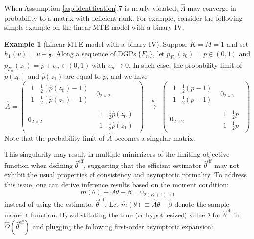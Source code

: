 \documentclass[11pt]{article}
\theoremstyle{definition}
\newtheorem{example}{Example}[section]
\newcommand{\0}{\ensuremath{\mathbf{0}}}
\begin{document}
\begin{bibunit}
When Assumption \ref{asp:identification}.7 is nearly violated, $\hat{A}$ may converge in probability to a matrix with deficient rank. For example, consider the following simple example on the linear MTE model with a binary IV.
\begin{example}[Linear MTE model with a binary IV]
    Suppose $K = M = 1$ and set $h_1(u) = u-\frac{1}{2}$. Along a sequence of DGPs $\{F_n\}$, let $p_{F_n}(z_0) = p \in (0,1)$ and $p_{F_n}(z_1) = p + \upsilon_{n} \in (0,1)$ with $\upsilon_n \to 0$. In such case, the probability limit of $\hat{p}(z_0)$ and $\hat{p}(z_1)$ are equal to $p$, and we have
    \[
        \hat{A}
        =
        \begin{pmatrix}
	\begin{matrix}
	1 & \frac{1}{2} (\hat{p}(z_0) - 1) \\
	1 & \frac{1}{2} (\hat{p}(z_1) - 1)
	\end{matrix} 
	&
	0_{2\times 2} \\
	0_{2\times 2} & 
	\begin{matrix}
	1 & \frac{1}{2}\hat{p}(z_0) \\
	1 & \frac{1}{2}\hat{p}(z_1)
	\end{matrix}
	\end{pmatrix}
        ~~
        \xrightarrow{p}
        ~~
        \begin{pmatrix}
	\begin{matrix}
	1 & \frac{1}{2} (p - 1) \\
	1 & \frac{1}{2} (p - 1)
	\end{matrix} 
	&
	0_{2\times 2} \\
	0_{2\times 2} & 
	\begin{matrix}
	1 & \frac{1}{2}p \\
	1 & \frac{1}{2}p
	\end{matrix}
	\end{pmatrix}
    \]
    Note that the probability limit of $\hat{A}$ becomes a singular matrix.
\end{example}
This singularity may result in multiple minimizers of the limiting objective function when defining $\hat{\theta}^{\text{eff}}$, suggesting that the efficient estimator $\hat{\theta}^{\text{eff}}$ may not exhibit the usual properties of consistency and asymptotic normality. To address this issue, one can derive inference results based on the moment condition:
\[
    {m}(\theta) \equiv {A}\theta - {\beta} = 0_{2(K+1)\times 1}
\]
instead of using the estimator $\hat{\theta}^{\text{eff}}$. Let $\hat{m}(\theta) \equiv \hat{A}\theta - \hat{\beta}$ denote the sample moment function. By substituting the true (or hypothesized) value $\theta$ for $\hat{\theta}^{\text{eff}}$ in $\hat{\Omega}(\hat{\theta}^{\text{eff}})$ and plugging the following first-order asymptotic expansion:

\end{bibunit}
\end{document}
